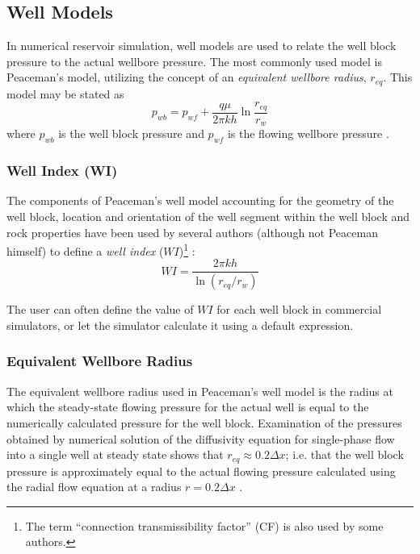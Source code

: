 \subsection{Well Models} %
\label{sub:well_models}
In numerical reservoir simulation, well models are used to relate the well block pressure to the actual wellbore pressure. The most commonly used model is Peaceman's model, utilizing the concept of an \emph{equivalent wellbore radius}, $r_{eq}$. This model may be stated as
\begin{equation}
    \label{eq:intro-well-model}
    p_{wb} = p_{wf} + \frac{q\mu}{2\pi k h} \ln \frac{r_{eq}}{r_{w}}
\end{equation}
where $p_{wb}$ is the well block pressure and $p_{wf}$ is the flowing wellbore pressure \cite{Peaceman1990Interpretation}.

\subsubsection{Well Index (WI)} %
\label{ssub:well_index_}
The components of Peaceman's well model accounting for the geometry of the well block, location and orientation of the well segment within the well block and rock properties have been used by several authors (although not Peaceman himself) to define a \emph{well index} ($WI$)\footnote{The term ``connection transmissibility factor'' (CF) is also used by some authors\cite{Peaceman2003New,Schlumberger2013Eclipse}.} \cite{Wolfsteiner2003Calculation}:
\begin{equation}
    \label{eq:well-index-intro}
    WI = \frac{2\pi kh}{\ln \left(r_{eq}/r_{w}\right)}
\end{equation}

The user can often define the value of $WI$ for each well block in commercial simulators, or let the simulator calculate it using a default expression.

\subsubsection{Equivalent Wellbore Radius} %
\label{ssub:equivalent_wellbore_radius}
The equivalent wellbore radius used in Peaceman's well model is the radius at which the steady-state flowing pressure for the actual well is equal to the numerically calculated pressure for the well block. Examination of the pressures obtained by numerical solution of the diffusivity equation for single-phase flow into a single well at steady state shows that $r_{eq} \approx 0.2 \Delta x$; i.e. that the well block pressure is approximately equal to the actual flowing pressure calculated using the radial flow equation at a radius $r = 0.2 \Delta x$ \cite{Peaceman1978Interpretation}.

